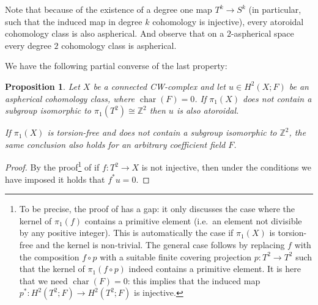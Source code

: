 \documentclass[a4paper,twoside]{article}
\theoremstyle{plain}
\newtheorem{proposition}[theorem]{Proposition}
\theoremstyle{definition}
\theoremstyle{remark}
\newcommand{\integers}{\mathbb{Z}}
\newcommand{\iso}{\cong}
\DeclareMathOperator{\characteristic}{char}
\begin{document}
Note that because of the existence of a degree one map $T^k\to S^k$ (in
particular, such that the induced map in degree $k$ cohomology is injective),
every atoroidal cohomology class is also aspherical. And observe that on a
$2$-aspherical space every degree $2$ cohomology class is aspherical.

We have the following partial converse of the last property:
\begin{proposition}\label{prop:automatic_atoroidal}
  Let $X$ be a connected CW-complex and let $u\in H^2(X;F)$ be an aspherical
  cohomology class, where $\characteristic(F)=0$. If $\pi_1(X)$ does not
  contain a subgroup
  isomorphic to $\pi_1(T^2)\iso \integers^2$ then $u$ is also atoroidal.

If $\pi_1(X)$ is torsion-free and does not contain a subgroup isomorphic to
$\integers^2$, the same conclusion also holds for an arbitrary coefficient
field $F$.
\end{proposition}
\begin{proof}
  By the proof\footnote{To be precise, the proof of \cite[Theorem 3]{Borat}
    has a gap: it only discusses the case where the kernel of $\pi_1(f)$
    contains a primitive element (i.e.~an element not divisible by any
    positive integer). This is automatically the case if $\pi_1(X)$ is
    torsion-free and the kernel is non-trivial. The general case follows by replacing $f$
    with the composition $f\circ p$ with a suitable finite covering projection
    $p\colon T^2\to T^2$ such that the kernel of $\pi_1(f\circ p)$ indeed
    contains a primitive element. It is here that we need
    $\characteristic(F)=0$: this implies that 
  the induced map $p^*\colon H^2(T^2;F)\to H^2(T^2;F)$ is injective.} of \cite[Theorem
  3]{Borat} if $f\colon T^2\to X$ is not injective, then under the conditions
  we have imposed  it holds that $f^*u=0$.
\end{proof}
\end{document}
